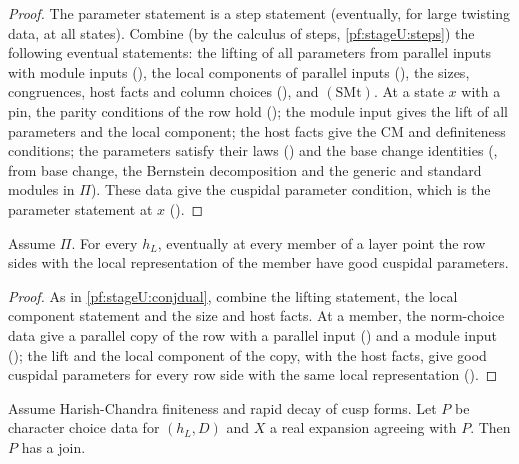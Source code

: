 \begin{proof}
The parameter statement is a step statement (eventually, for large twisting data, at all states). Combine (by the calculus of
steps, \cref{pf:stageU:steps}) the following eventual statements: the lifting of all parameters from parallel inputs with module
inputs (), the local components of parallel inputs
(), the sizes, congruences, host facts and column choices
(), and $\mathrm{(SMt)}$. At a state $x$ with a pin, the
parity conditions of the row hold (); the module input gives the lift of
all parameters and the local component; the host facts give the CM and definiteness conditions; the parameters satisfy their
laws () and the base change identities
(, from base change, the Bernstein decomposition and the generic
and standard modules in $\Pi$). These data give the cuspidal parameter condition, which is the parameter statement at $x$
().
\end{proof}

\begin{lemma}\label{pf:stageU:cuspparam}
Assume $\Pi$. For every $h_L$, eventually at every member of a layer point the row sides with the local representation of the
member have good cuspidal parameters.
\end{lemma}

\begin{proof}
As in \cref{pf:stageU:conjdual}, combine the lifting statement, the local component statement and the size and host facts.
At a member, the norm-choice data give a parallel copy of the row with a parallel input
() and a module input
(); the lift and the local component of the copy, with the host
facts, give good cuspidal parameters for every row side with the same local representation
().
\end{proof}

\begin{lemma}\label{pf:stageU:join}
Assume Harish-Chandra finiteness and rapid decay of cusp forms. Let $P$ be character choice data for $(h_L,D)$ and $X$ a real
expansion agreeing with $P$. Then $P$ has a join.
\end{lemma}

